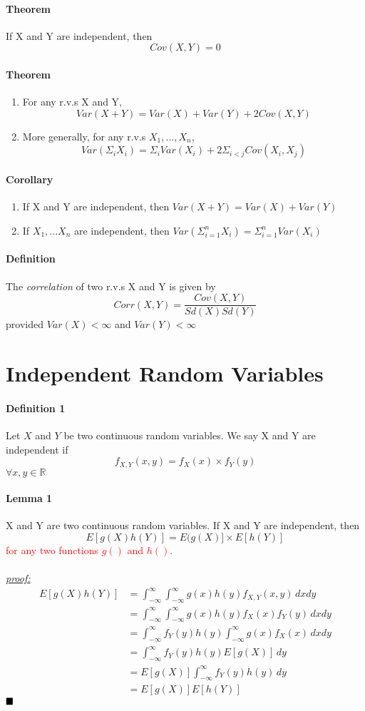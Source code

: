 \documentclass[11pt]{article}
\newcommand{\ti}[1]{\textit{#1}}
\newcommand{\proof}[0]{\textit{\underline{proof: }}}
\newcommand{\qed}[0]{$\hfill\blacksquare$}
\begin{document}
\paragraph{Theorem} If X and Y are independent, then $$Cov(X,Y) = 0$$
\paragraph{Theorem} 
\begin{enumerate}
\item For any r.v.s X and Y,
$$Var(X+Y) = Var(X) + Var(Y) + 2Cov(X,Y)$$
\item More generally, for any r.v.s $X_1,...,X_n$,$$Var(\Sigma_i X_i) = \Sigma_i Var(X_i) + 2\Sigma_{i < j}Cov(X_i,X_j)$$
\end{enumerate}
\paragraph{Corollary}
\begin{enumerate}
	\item If X and Y are independent, then $Var(X+Y) = Var(X) + Var(Y)$
	\item If $X_1,...X_n$ are independent, then $Var(\Sigma_{i=1}^n X_i) = \Sigma_{i=1}^nVar(X_i)$
\end{enumerate}
\paragraph{Definition} The \ti{correlation} of two r.v.s X and Y is given by
$$Corr(X,Y) = \frac{Cov(X,Y)}{Sd(X)Sd(Y)}$$ 
provided $Var(X) < \infty$ and $Var(Y) < \infty$
\section{Independent Random Variables}
\paragraph{Definition 1} Let $X$ and $Y$ be two continuous random variables. We say X and Y are independent if
$$f_{X,Y}(x,y) = f_X(x) \times f_Y(y)$$
$\forall x,y \in \mathbb{R}$
\paragraph{Lemma 1} X and Y are two continuous random variables. If X and Y are independent, then
$$E[g(X)h(Y)] = E(g(X)] \times E[h(Y)]$$
\textcolor{red}{for any two functions $g()$ and $h()$.} \\\\
\proof\\
\begin{align*}
	E[g(X)h(Y)] &= \int_{-\infty}^\infty \int_{-\infty}^\infty g(x)h(y)f_{X,Y}(x,y)\,dxdy\\
	&= \int_{-\infty}^\infty \int_{-\infty}^\infty g(x)h(y)f_X(x)f_Y(y)\,dxdy\\
	&= \int_{-\infty}^\infty f_Y(y)h(y)\int_{-\infty}^\infty g(x)f_X(x)\,dxdy\\
	&= \int_{-\infty}^\infty f_Y(y)h(y)E[g(X)]\,dy\\
	&= E[g(X)]\int_{-\infty}^\infty f_Y(y)h(y)\,dy\\
	&= E[g(X)]E[h(Y)]
\end{align*}
\qed
\end{document}
